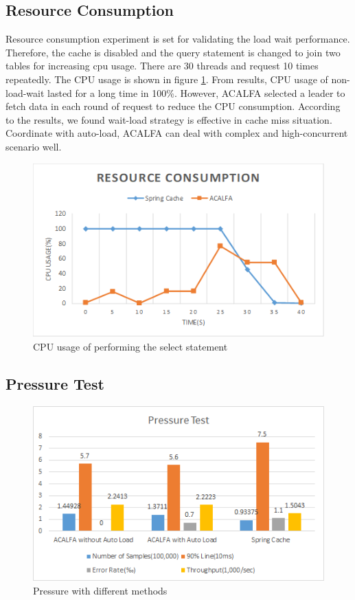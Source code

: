 \documentclass[conference]{IEEEtran}
\begin{document}
\subsection{Resource Consumption}

Resource consumption experiment is set for validating the load wait performance. Therefore, the cache is disabled and the query statement is changed to join two tables for increasing cpu usage. There are 30 threads and request 10 times repeatedly. The CPU usage is shown in figure \ref{resource}. From results, CPU usage of non-load-wait lasted for a long time in 100\%. However, ACALFA selected a leader to fetch data in each round of request to reduce the CPU consumption. According to the results, we found wait-load strategy is effective in cache miss situation. Coordinate with auto-load, ACALFA can deal with complex and high-concurrent scenario well.

\begin{figure} [htb]
    \centering
    \includegraphics[width=1\linewidth]{img/resource.png}
    \caption{CPU usage of performing the select statement}
    \label{resource}
\end{figure}

\subsection{Pressure Test}

 \begin{figure}
     \centering
     \includegraphics[width=1\linewidth]{img/pressuretest.png}
     \caption{Pressure with different methods}
     \label{pressuretest}
 \end{figure}
\end{document}
